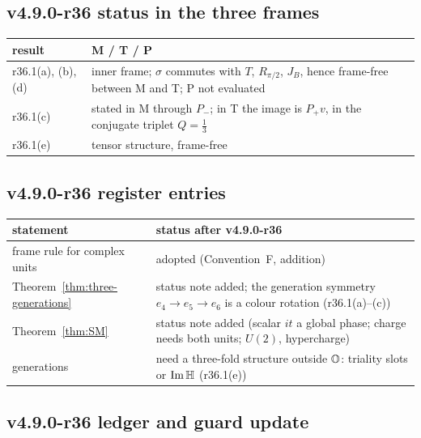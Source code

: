 \subsection*{v4.9.0-r36 status in the three frames}
\label{subsec:v490-r36-frames}

\begin{center}
\small
\begin{tabular}{@{}>{\raggedright\arraybackslash}p{}>{\raggedright\arraybackslash}p{}@{}}
\toprule
result & M / T / P\\
\midrule
r36.1(a), (b), (d) & inner frame; \(\sigma\) commutes with \(T\), \(R_{\pi/2}\), \(J_B\), hence frame-free between M and T; P not evaluated\\
r36.1(c) & stated in M through \(P_-\); in T the image is \(P_+v\), in the conjugate triplet \(Q=\tfrac13\)\\
r36.1(e) & tensor structure, frame-free\\
\bottomrule
\end{tabular}
\end{center}

\subsection*{v4.9.0-r36 register entries}
\label{subsec:v490-r36-register}

\begin{center}
\small
\begin{tabular}{@{}>{\raggedright\arraybackslash}p{}>{\raggedright\arraybackslash}p{}@{}}
\toprule
statement & status after v4.9.0-r36\\
\midrule
frame rule for complex units & adopted (Convention~F, addition)\\
Theorem~\ref{thm:three-generations} & status note added; the generation symmetry \(e_4\to e_5\to e_6\) is a colour rotation (r36.1(a)--(c))\\
Theorem~\ref{thm:SM} & status note added (scalar \(it\) a global phase; charge needs both units; \(U(2)\), hypercharge)\\
generations & need a three-fold structure outside \(\mathbb{O}\): triality slots or \(\operatorname{Im}\mathbb{H}\) (r36.1(e))\\
\bottomrule
\end{tabular}
\end{center}

\subsection*{v4.9.0-r36 ledger and guard update}
\label{subsec:v490-r36-ledger-guard}

